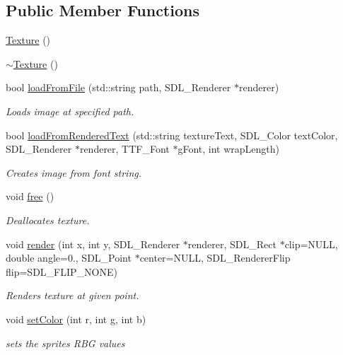 \subsection*{Public Member Functions}
\begin{DoxyCompactItemize}
\item 
\hyperlink{class_texture_a6c275e3f186675ff6ed73ccf970e552f}{Texture} ()
\item 
\hyperlink{class_texture_a09c4bcb7462f64c1d20fa69dba3cee8a}{$\sim$\+Texture} ()
\item 
bool \hyperlink{class_texture_a1c143b8aa5f134bb5a8c9d4c3d950d2f}{load\+From\+File} (std\+::string path, S\+D\+L\+\_\+\+Renderer $\ast$renderer)
\begin{DoxyCompactList}\small\item\em Loads image at specified path. \end{DoxyCompactList}\item 
bool \hyperlink{class_texture_a78708fd59f16721c2c19b2075a91e1bc}{load\+From\+Rendered\+Text} (std\+::string texture\+Text, S\+D\+L\+\_\+\+Color text\+Color, S\+D\+L\+\_\+\+Renderer $\ast$renderer, T\+T\+F\+\_\+\+Font $\ast$g\+Font, int wrap\+Length)
\begin{DoxyCompactList}\small\item\em Creates image from font string. \end{DoxyCompactList}\item 
void \hyperlink{class_texture_a46d06aec832e5a954f1c8ca957c2c6e5}{free} ()
\begin{DoxyCompactList}\small\item\em Deallocates texture. \end{DoxyCompactList}\item 
void \hyperlink{class_texture_ac91a5257c451c80ffbf9a3d1485ba1c8}{render} (int x, int y, S\+D\+L\+\_\+\+Renderer $\ast$renderer, S\+D\+L\+\_\+\+Rect $\ast$clip=N\+U\+LL, double angle=0., S\+D\+L\+\_\+\+Point $\ast$center=N\+U\+LL, S\+D\+L\+\_\+\+Renderer\+Flip flip=S\+D\+L\+\_\+\+F\+L\+I\+P\+\_\+\+N\+O\+NE)
\begin{DoxyCompactList}\small\item\em Renders texture at given point. \end{DoxyCompactList}\item 
void \hyperlink{class_texture_ab3149eb648f437a09dc0938942c2c4ce}{set\+Color} (int r, int g, int b)
\begin{DoxyCompactList}\small\item\em sets the sprites R\+BG values \end{DoxyCompactList}\item 

\end{DoxyCompactItemize}
